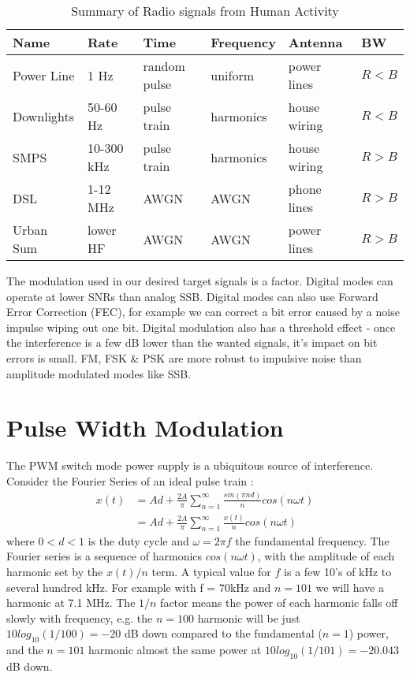 \documentclass{article}
\begin{document}
\begin{table}[h]
\centering
\begin{tabular}{l l l l l l}
 \hline
 Name & Rate & Time & Frequency & Antenna & BW \\
 \hline
 Power Line & 1 Hz & random pulse & uniform & power lines & $R < B$ \\
 Downlights & 50-60 Hz & pulse train & harmonics & house wiring & $R < B$ \\
 SMPS & 10-300 kHz & pulse train & harmonics & house wiring & $R > B$ \\
 DSL & 1-12 MHz & AWGN & AWGN & phone lines & $R > B$ \\
 Urban Sum & lower HF & AWGN & AWGN & power lines & $R > B$ \\
 \hline
\end{tabular}
\caption{Summary of Radio signals from Human Activity}
\label{table:human_noise}
\end{table}

The modulation used in our desired target signals is a factor.  Digital modes can operate at lower SNRs than analog SSB.  Digital modes can also use Forward Error Correction (FEC), for example we can correct a bit error caused by a noise impulse wiping out one bit.  Digital modulation also has a threshold effect - once the interference is a few dB lower than the wanted signals, it's impact on bit errors is small. FM, FSK \& PSK are more robust to impulsive noise than amplitude modulated modes like SSB.

\section{Pulse Width Modulation}

The PWM switch mode power supply is a ubiquitous source of interference.  Consider the Fourier Series of an ideal pulse train \cite{wikipedia_pulse}:
\begin{equation} \label{eq_pwm}
\begin{split}
x(t) &= Ad+\frac{2A}{\pi} \sum_{n=1}^{\infty} \frac{sin(\pi n d)}{n}cos(n \omega t) \\
     &= Ad+\frac{2A}{\pi} \sum_{n=1}^{\infty} \frac{x(t)}{n} cos(n \omega t)
\end{split}
\end{equation}
where $0<d<1$ is the duty cycle and $\omega=2 \pi f$ the fundamental frequency.  The Fourier series is a sequence of harmonics $cos(n \omega t)$, with the amplitude of each harmonic set by the $x(t)/n$ term. A typical value for $f$ is a few 10's of kHz to several hundred kHz. For example with f = 70kHz and $n=101$ we will have a harmonic at 7.1 MHz. The $1/n$ factor means the power of each harmonic falls off slowly with frequency, e.g. the $n=100$ harmonic will be just $10log_{10}(1/100)=-20$ dB down compared to the fundamental ($n=1$) power, and the $n=101$ harmonic almost the same power at $10log_{10}(1/101)=-20.043$ dB down.
\end{document}
